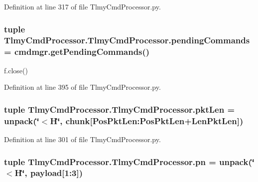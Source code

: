 Definition at line 317 of file Tlmy\+Cmd\+Processor.\+py.

\hypertarget{namespace_tlmy_cmd_processor_1_1_tlmy_cmd_processor_a1d93029bff9d6ab97db745a744688bbd}{}
\subsubsection[{pending\+Commands}]{\setlength{\rightskip}{0pt plus 5cm}tuple Tlmy\+Cmd\+Processor.\+Tlmy\+Cmd\+Processor.\+pending\+Commands = cmdmgr.\+get\+Pending\+Commands()}\label{namespace_tlmy_cmd_processor_1_1_tlmy_cmd_processor_a1d93029bff9d6ab97db745a744688bbd}


f.\+close() 



Definition at line 395 of file Tlmy\+Cmd\+Processor.\+py.

\hypertarget{namespace_tlmy_cmd_processor_1_1_tlmy_cmd_processor_aa4bf4ee35125c7aaeb50dfe9bd888320}{}
\subsubsection[{pkt\+Len}]{\setlength{\rightskip}{0pt plus 5cm}tuple Tlmy\+Cmd\+Processor.\+Tlmy\+Cmd\+Processor.\+pkt\+Len = unpack(\char`\"{}$<$H\char`\"{}, chunk\mbox{[}Pos\+Pkt\+Len\+:\+Pos\+Pkt\+Len+{\bf Len\+Pkt\+Len}\mbox{]})}\label{namespace_tlmy_cmd_processor_1_1_tlmy_cmd_processor_aa4bf4ee35125c7aaeb50dfe9bd888320}


Definition at line 301 of file Tlmy\+Cmd\+Processor.\+py.

\hypertarget{namespace_tlmy_cmd_processor_1_1_tlmy_cmd_processor_a89663fb42c0b2e4e664217680921e07b}{}
\subsubsection[{pn}]{\setlength{\rightskip}{0pt plus 5cm}tuple Tlmy\+Cmd\+Processor.\+Tlmy\+Cmd\+Processor.\+pn = unpack(\char`\"{}$<$H\char`\"{}, payload\mbox{[}1\+:3\mbox{]})}\label{namespace_tlmy_cmd_processor_1_1_tlmy_cmd_processor_a89663fb42c0b2e4e664217680921e07b}


